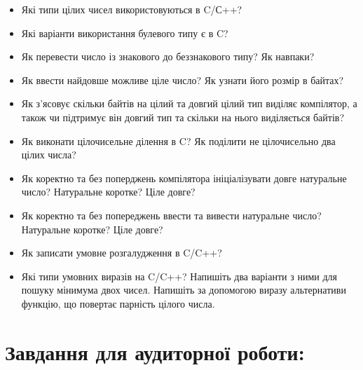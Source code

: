 \documentclass[a5paper,titlepage,openany,twoside,
]
{book_unv}%
\begin{document}
\begin{itemize}
\item Які типи цілих чисел використовуються в C/С++?
\item Які варіанти використання булевого типу є в C?
\item Як перевести число із знакового до беззнакового типу? Як навпаки?
\item Як ввести найдовше можливе ціле число? Як узнати його розмір в
байтах?
\item Як з'ясовує скільки байтів на цілий та довгий
цілий тип виділяє компілятор, а також чи підтримує він довгий тип та
скільки на нього виділяється байтів?
\item Як виконати цілочисельне ділення в C? Як поділити не цілочисельно
два цілих числа?
\item Як коректно та без поперджень компілятора ініціалізувати довге
натуральне число? Натуральне коротке? Ціле довге?
\item Як коректно та без попереджень ввести та вивести натуральне число?
Натуральне коротке? Ціле довге?
\item Як записати умовне розгалудження в C/C++?
\item Які типи умовних виразів на C/C++? Напишіть два варіанти з ними для
пошуку мінимума двох чисел. Напишіть за допомогою виразу альтернативи
функцію, що повертає парність цілого числа.
\end{itemize}

\section{Завдання для аудиторної роботи:}
\end{document}
